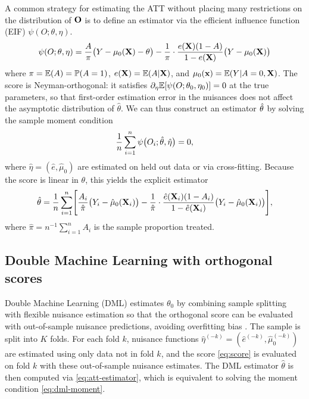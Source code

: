 \documentclass[12pt]{article}
\begin{document}
A common strategy for estimating the ATT without placing many restrictions on the distribution of $\mathbf{O}$ is to define an estimator via the efficient influence function (EIF) $\psi(O; \theta, \eta)$.
\begin{equation}
\label{eq:score}
\psi(O; \theta, \eta) = \frac{A}{\pi}\bigl( Y - \mu_0(\mathbf{X}) - \theta \bigr) - \frac{1}{\pi} \cdot \frac{e(\mathbf{X})(1-A)}{1 - e(\mathbf{X})} \bigl( Y - \mu_0(\mathbf{X}) \bigr)
\end{equation}
where $\pi = \mathbb{E}(A) = \mathbb{P}(A=1)$, $e(\mathbf{X}) = \mathbb{E}(A | \mathbf{X})$, and $\mu_0(\mathbf{x}) = \mathbb{E}(Y | A = 0, \mathbf{X})$. The score is Neyman-orthogonal: it satisfies $\partial_\eta \mathbb{E}[\psi(O; \theta_0, \eta_0)] = 0$ at the true parameters, so that first-order estimation error in the nuisances does not affect the asymptotic distribution of $\hat\theta$. We can thus construct an estimator $\hat{\theta}$ by solving the sample moment condition
\begin{equation}
\label{eq:dml-moment}
\frac{1}{n} \sum_{i=1}^n \psi\bigl(O_i; \hat{\theta}, \hat\eta\bigr) = 0,
\end{equation}
where $\hat\eta = (\hat{e}, \hat{\mu}_0)$ are estimated on held out data or via cross-fitting. Because the score is linear in $\theta$, this yields the explicit estimator
\begin{equation}
\label{eq:att-estimator}
\hat{\theta} = \frac{1}{n} \sum_{i=1}^n \Biggl[ \frac{A_i}{\hat\pi}\bigl( Y_i - \hat\mu_0(\mathbf{X}_i) \bigr) - \frac{1}{\hat\pi} \cdot \frac{\hat{e}(\mathbf{X}_i)(1-A_i)}{1 - \hat{e}(\mathbf{X}_i)} \bigl( Y_i - \hat\mu_0(\mathbf{X}_i) \bigr) \Biggr],
\end{equation}
where $\hat\pi = n^{-1}\sum_{i=1}^n A_i$ is the sample proportion treated. 

\subsection{Double Machine Learning with orthogonal scores}

Double Machine Learning (DML) estimates $\theta_0$ by combining sample splitting with flexible nuisance estimation so that the orthogonal score can be evaluated with out-of-sample nuisance predictions, avoiding overfitting bias \citep{chernozhukov2018}. The sample is split into $K$ folds. For each fold $k$, nuisance functions $\hat\eta^{(-k)} = (\hat{e}^{(-k)}, \hat{\mu}_0^{(-k)})$ are estimated using only data not in fold $k$, and the score \eqref{eq:score} is evaluated on fold $k$ with these out-of-sample nuisance estimates. The DML estimator $\hat\theta$ is then computed via \eqref{eq:att-estimator}, which is equivalent to solving the moment condition \eqref{eq:dml-moment}.
\end{document}
